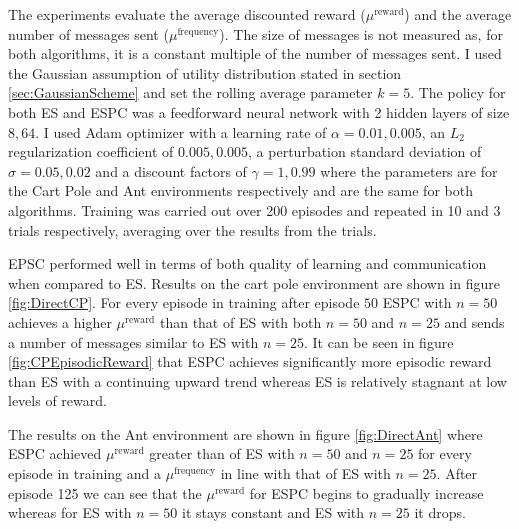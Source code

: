 The experiments evaluate the average discounted reward ($\mu^{\text{reward}}$) and the average number of messages sent ($\mu^{\text{frequency}}$). The size of messages is not measured as, for both algorithms, it is a constant multiple of the number of messages sent.
I used the Gaussian assumption of utility distribution stated in section \ref{sec:GaussianScheme} and set the rolling average parameter $k=5$. The policy for both ES and ESPC was a feedforward neural network with 2 hidden layers of size $8,64$. I used Adam optimizer \cite{Adam} with a learning rate of $\alpha=0.01,0.005$, an $L_2$ regularization coefficient of $0.005,0.005$, a perturbation standard deviation of $\sigma=0.05,0.02$ and a discount factors of $\gamma=1,0.99$ where the parameters are for the Cart Pole and Ant environments respectively and are the same for both algorithms. Training was carried out over 200 episodes and repeated in 10 and 3 trials respectively, averaging over the results from the trials.
\label{sec:ESPCEval}

EPSC performed well in terms of both quality of learning and communication when compared to ES. 
Results on the cart pole environment are shown in figure \ref{fig:DirectCP}. For every episode in training after episode $50$ ESPC with $n=50$ achieves a higher $\mu^\text{reward}$ than that of ES with both $n=50$ and $n=25$ and sends a number of messages similar to ES with $n=25$. It can be seen in figure \ref{fig:CPEpisodicReward} that ESPC achieves significantly more episodic reward than ES with a continuing upward trend whereas ES is relatively stagnant at low levels of reward.

The results on the Ant environment are shown in figure \ref{fig:DirectAnt} where ESPC achieved $\mu^\text{reward}$ greater than of ES with $n=50$ and $n=25$ for every episode in training and a $\mu^\text{frequency}$ in line with that of ES with $n=25$. After episode 125 we can see that the $\mu^\text{reward}$ for ESPC begins to gradually increase whereas for ES with $n=50$ it stays constant and ES with $n=25$ it drops.

